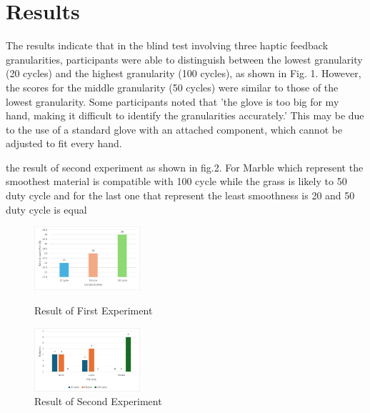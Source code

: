 \documentclass[a4paper,twocolumn]{article}
\begin{document}
\section{Results}
The results indicate that in the blind test involving three haptic feedback granularities, participants were able to distinguish between the lowest granularity (20 cycles) and the highest granularity (100 cycles), as shown in Fig. 1. However, the scores for the middle granularity (50 cycles) were similar to those of the lowest granularity. Some participants noted that 'the glove is too big for my hand, making it difficult to identify the granularities accurately.' This may be due to the use of a standard glove with an attached component, which cannot be adjusted to fit every hand.\par
the result of second experiment as shown in fig.2. For Marble which represent the smoothest material is compatible with 100 cycle while the grass is likely to 50 duty cycle and for the last one that represent the least smoothness is 20 and 50 duty cycle is equal

\begin{figure}[h]
  \centering
  \includegraphics[width=0.35\textwidth]{./Fig/Blind_Test_graph.png}
  \caption{{Result of First Experiment}}
  \label{fig1}
  \vspace{0.1cm}
  \centering
  \includegraphics[width=0.35\textwidth]{./Fig/Select_Cycle_graph.png}
  \caption{{Result of Second Experiment}}
  \label{fig2}
\end{figure}
\end{document}

